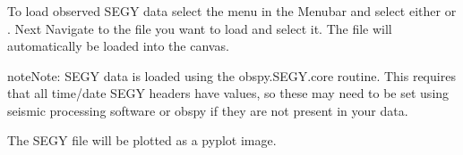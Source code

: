 \documentclass[a4paper,12pt,english]{sphinxmanual}
\begin{document}
\subsection{}
\label{\detokenize{manual__segy:loading-segy-data}}
To load observed SEGY data select the  menu in the Menubar and select either
 or .
Next Navigate to the file you want to load and select it.
The file will automatically be loaded into the canvas.

\begin{sphinxadmonition}{note}{Note:}
SEGY data is loaded using the obspy.SEGY.core routine. This requires that all time/date SEGY headers have values,
so these may need to be set using seismic processing software or obspy if they are not present in your data.

The SEGY file will be plotted as a pyplot image.
\end{sphinxadmonition}


\section{}
\label{\detokenize{manual__geology:geologic-data}}\label{\detokenize{manual__geology::doc}}

\subsection{}
\label{\detokenize{manual__geology:loading-geologic-data}}

\section{}
\label{\detokenize{manual__export_figure:export-figure}}\label{\detokenize{manual__export_figure::doc}}

\chapter{}
\label{\detokenize{tutorial::doc}}\label{\detokenize{tutorial:tutorial}}

\chapter{}
\label{\detokenize{contribute:contribute}}\label{\detokenize{contribute::doc}}\label{\detokenize{contribute:contibute}}
\end{document}
